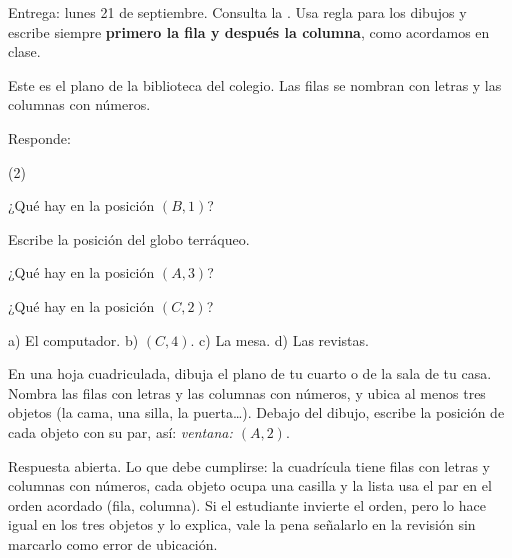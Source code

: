 \documentclass[11pt]{article}
\begin{document}
\encabezado

\begin{instrucciones}
Entrega: lunes 21 de septiembre. Consulta la . Usa regla para los dibujos y escribe siempre \textbf{primero
la fila y después la columna}, como acordamos en clase.
\end{instrucciones}

\begin{preguntas}

\pregunta Este es el plano de la biblioteca del colegio. Las filas se nombran con letras y
las columnas con números.

\begin{center}
\end{center}

Responde:
\begin{opciones*}(2)
  \item ¿Qué hay en la posición $(B,1)$?
  \item Escribe la posición del globo terráqueo.
  \item ¿Qué hay en la posición $(A,3)$?
  \item ¿Qué hay en la posición $(C,2)$?
\end{opciones*}
\begin{solucion}[3cm]
a) El computador. \quad b) $(C,4)$. \quad c) La mesa. \quad d) Las revistas.
\end{solucion}

\pregunta En una hoja cuadriculada, dibuja el plano de tu cuarto o de la sala de tu casa.
Nombra las filas con letras y las columnas con números, y ubica al menos tres objetos
(la cama, una silla, la puerta\ldots). Debajo del dibujo, escribe la posición de cada objeto
con su par, así: \emph{ventana: $(A,2)$}.
\espacio{1cm}
\begin{solucion}
Respuesta abierta. Lo que debe cumplirse: la cuadrícula tiene filas con letras y columnas con
números, cada objeto ocupa una casilla y la lista usa el par en el orden acordado (fila,
columna). Si el estudiante invierte el orden, pero lo hace igual en los tres objetos y lo
explica, vale la pena señalarlo en la revisión sin marcarlo como error de ubicación.
\end{solucion}


\end{preguntas}
\end{document}
